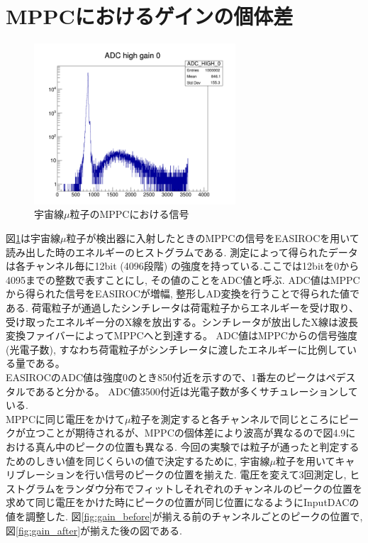 \section{MPPCにおけるゲインの個体差}\label{sec:mppc_gain_diff}
\begin{figure}[H]
    \centering
    \includegraphics[height=6cm]{img/mppc_gain.jpg}
    \caption{宇宙線$\mu$粒子のMPPCにおける信号}
    \label{fig:mu_mppc}
\end{figure}
図\ref{fig:mu_mppc}は宇宙線$\mu$粒子が検出器に入射したときのMPPCの信号をEASIROCを用いて読み出した時のエネルギーのヒストグラムである.
測定によって得られたデータは各チャンネル毎に12bit (4096段階) の強度を持っている.ここでは12bitを0から4095までの整数で表すことにし, その値のことをADC値と呼ぶ.
ADC値はMPPCから得られた信号をEASIROCが増幅, 整形しAD変換を行うことで得られた値である.
荷電粒子が通過したシンチレータは荷電粒子からエネルギーを受け取り、受け取ったエネルギー分のX線を放出する。シンチレータが放出したX線は波長変換ファイバーによってMPPCへと到達する。
ADC値はMPPCからの信号強度(光電子数), すなわち荷電粒子がシンチレータに渡したエネルギーに比例している量である。
\\
EASIROCのADC値は強度0のとき850付近を示すので、1番左のピークはペデスタルであると分かる。
ADC値3500付近は光電子数が多くサチュレーションしている.\\
MPPCに同じ電圧をかけて$\mu$粒子を測定すると各チャンネルで同じところにピークが立つことが期待されるが、MPPCの個体差により波高が異なるので図4.9における真ん中のピークの位置も異なる.
今回の実験では粒子が通ったと判定するためのしきい値を同じくらいの値で決定するために, 宇宙線$\mu$粒子を用いてキャリブレーションを行い信号のピークの位置を揃えた.
電圧を変えて3回測定し, ヒストグラムをランダウ分布でフィットしそれぞれのチャンネルのピークの位置を求めて同じ電圧をかけた時にピークの位置が同じ位置になるようにInputDACの値を調整した.
図\ref{fig:gain_before}が揃える前のチャンネルごとのピークの位置で, 図\ref{fig:gain_after}が揃えた後の図である.
